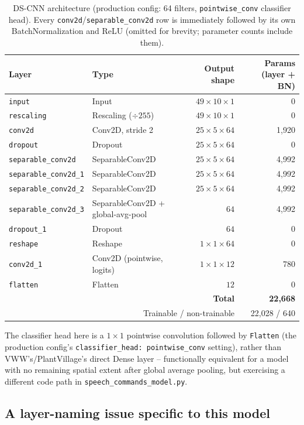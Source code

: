\documentclass[11pt]{article}
\newcommand{\code}[1]{\texttt{#1}}
\begin{document}
\begin{table}[H]
\centering
\caption{DS-CNN architecture (production config: 64 filters, \code{pointwise\_conv} classifier head). Every \code{conv2d}/\code{separable\_conv2d} row is immediately followed by its own BatchNormalization and ReLU (omitted for brevity; parameter counts include them).}
\label{tab:arch}
\begin{tabular}{@{}llrr@{}}
\toprule
Layer & Type & Output shape & Params (layer + BN) \\
\midrule
\code{input} & Input & $49\times10\times1$ & 0 \\
\code{rescaling} & Rescaling ($\div 255$) & $49\times10\times1$ & 0 \\
\code{conv2d} & Conv2D, stride 2 & $25\times5\times64$ & 1{,}920 \\
\code{dropout} & Dropout & $25\times5\times64$ & 0 \\
\code{separable\_conv2d} & SeparableConv2D & $25\times5\times64$ & 4{,}992 \\
\code{separable\_conv2d\_1} & SeparableConv2D & $25\times5\times64$ & 4{,}992 \\
\code{separable\_conv2d\_2} & SeparableConv2D & $25\times5\times64$ & 4{,}992 \\
\code{separable\_conv2d\_3} & SeparableConv2D + global-avg-pool & $64$ & 4{,}992 \\
\code{dropout\_1} & Dropout & $64$ & 0 \\
\code{reshape} & Reshape & $1\times1\times64$ & 0 \\
\code{conv2d\_1} & Conv2D (pointwise, logits) & $1\times1\times12$ & 780 \\
\code{flatten} & Flatten & $12$ & 0 \\
\midrule
\multicolumn{3}{r}{\textbf{Total}} & \textbf{22{,}668} \\
\multicolumn{3}{r}{Trainable / non-trainable} & 22{,}028 / 640 \\
\bottomrule
\end{tabular}
\end{table}

The classifier head here is a $1\times1$ pointwise convolution followed by \code{Flatten} (the production config's \code{classifier\_head: pointwise\_conv} setting), rather than VWW's/PlantVillage's direct Dense layer -- functionally equivalent for a model with no remaining spatial extent after global average pooling, but exercising a different code path in \code{speech\_commands\_model.py}.

\subsection{A layer-naming issue specific to this model}
\label{sec:naming}
\end{document}
